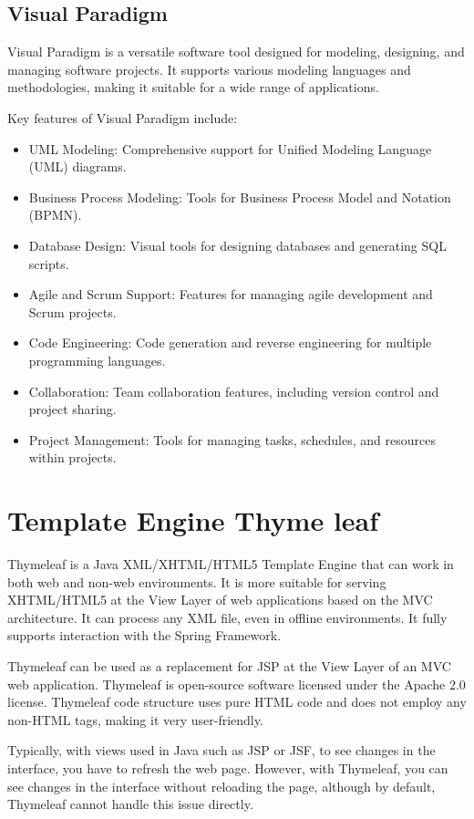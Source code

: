 \documentclass[../Main.tex]{subfiles}
\begin{document}
\subsection{Visual Paradigm}

Visual Paradigm is a versatile software tool designed for modeling, designing, and managing software projects.
It supports various modeling languages and methodologies, making it suitable for a wide range of applications.

Key features of Visual Paradigm include:
\begin{itemize}
    \item UML Modeling: Comprehensive support for Unified Modeling Language (UML) diagrams.
    \item Business Process Modeling: Tools for Business Process Model and Notation (BPMN).
    \item Database Design: Visual tools for designing databases and generating SQL scripts.
    \item Agile and Scrum Support: Features for managing agile development and Scrum projects.
    \item Code Engineering: Code generation and reverse engineering for multiple programming languages.
    \item Collaboration: Team collaboration features, including version control and project sharing.
    \item Project Management: Tools for managing tasks, schedules, and resources within projects.
\end{itemize}

\section{Template Engine Thyme leaf}

Thymeleaf is a Java XML/XHTML/HTML5 Template Engine that can work in both web and non-web environments.
It is more suitable for serving XHTML/HTML5 at the View Layer of web applications based on the MVC architecture.
It can process any XML file, even in offline environments.
It fully supports interaction with the Spring Framework.

Thymeleaf can be used as a replacement for JSP at the View Layer of an MVC web application.
Thymeleaf is open-source software licensed under the Apache 2.0 license.
Thymeleaf code structure uses pure HTML code and does not employ any non-HTML tags, making it very user-friendly.

Typically, with views used in Java such as JSP or JSF, to see changes in the interface, you have to refresh the web page.
However, with Thymeleaf, you can see changes in the interface without reloading the page, although by default, Thymeleaf cannot handle this issue directly.
\end{document}

